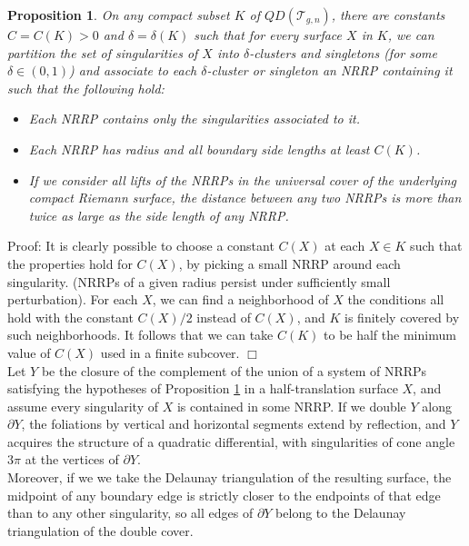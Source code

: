 \documentclass[12pt]{article}
\newtheorem{proposition}[theorem]{Proposition}
\begin{document}
\begin{proposition} \label{PropDecompControl} On any compact subset $K$ of $QD(\mathcal{T}_{g,n})$, there are constants $C = C(K) > 0$ and $\delta = \delta(K)$ such that for every surface $X$ in $K$, we can partition the set of singularities of $X$ into $\delta$-clusters and singletons (for some $\delta \in (0,1)$) and associate to each $\delta$-cluster or singleton an NRRP containing it such that the following hold:

\begin{itemize}
\item Each NRRP contains only the singularities associated to it.
\item Each NRRP has radius and all boundary side lengths at least $C(K)$.
\item If we consider all lifts of the NRRPs in the universal cover of the underlying compact Riemann surface, the distance between any two NRRPs is more than twice as large as the side length of any NRRP.
\end{itemize}
\end{proposition}

\noindent Proof: It is clearly possible to choose a constant $C(X)$ at each $X \in K$ such that the properties hold for $C(X)$, by picking a small NRRP around each singularity. (NRRPs of a given radius persist under sufficiently small perturbation). For each $X$, we can find a neighborhood of $X$ the conditions all hold with the constant $C(X)/2$ instead of $C(X)$, and $K$ is finitely covered by such neighborhoods. It follows that we can take $C(K)$ to be half the minimum value of $C(X)$ used in a finite subcover. $\Box$\\

\noindent Let $Y$ be the closure of the complement of the union of a system of NRRPs satisfying the hypotheses of Proposition \ref{PropDecompControl} in a half-translation surface $X$, and assume every singularity of $X$ is contained in some NRRP. If we double $Y$ along $\partial Y$, the foliations by vertical and horizontal segments extend by reflection, and $Y$ acquires the structure of a quadratic differential, with singularities of cone angle $3\pi$ at the vertices of $\partial Y$.\\

\noindent Moreover, if we we take the Delaunay triangulation of the resulting surface, the midpoint of any boundary edge is strictly closer to the endpoints of that edge than to any other singularity, so all edges of $\partial Y$ belong to the Delaunay triangulation of the double cover.\\
\end{document}

